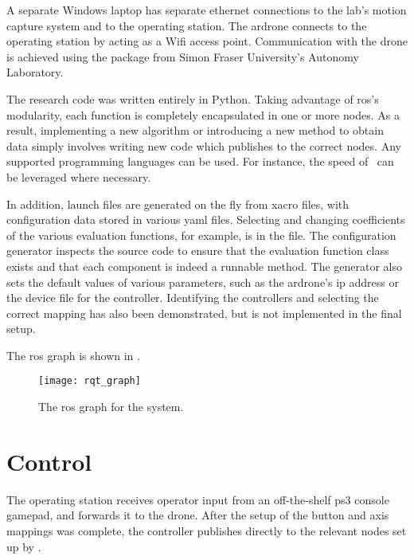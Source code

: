     A separate Windows laptop has separate ethernet connections to the lab's motion capture system and to the operating station.
    The \gls{ardrone} connects to the operating station by acting as a Wifi access point.
    Communication with the drone is achieved using the \textsf{} package from Simon Fraser University's Autonomy Laboratory.

    The research code was written entirely in Python.
    Taking advantage of \gls{ros}'s modularity, each function is completely encapsulated in one or more nodes.
    As a result, implementing a new algorithm or introducing a new method to obtain data simply involves writing new code which publishes to the correct nodes.
    Any supported programming languages can be used.
    For instance, the speed of \cpp\ can be leveraged where necessary.
    
    In addition, launch files are generated on the fly from \textsf{xacro} files, with configuration data stored in various \gls{yaml} files.
    Selecting and changing coefficients of the various evaluation functions, for example, is in the \textsf{} file.
    The configuration generator inspects the source code to ensure that the evaluation function class exists and that each component is indeed a runnable method.
    The generator also sets the default values of various parameters, such as the \gls{ardrone}'s \gls{ip} address or the device file for the controller.
    Identifying the controllers and selecting the correct mapping has also been demonstrated, but is not implemented in the final setup.

    The \gls{ros} graph is shown in .
    \begin{figure}[h]
      \centering
      \texttt{[image: rqt\_graph]}
      \caption[ROS Graph]{The \gls{ros} graph for the system.}
      \label{fig:rqt_graph}
    \end{figure}

  \section{Control}
    The operating station receives operator input from an off-the-shelf \gls{ps3} console gamepad, and forwards it to the drone.
    After the setup of the button and axis mappings was complete, the controller publishes directly to the relevant \texttt{} nodes set up by \textsf{}.

